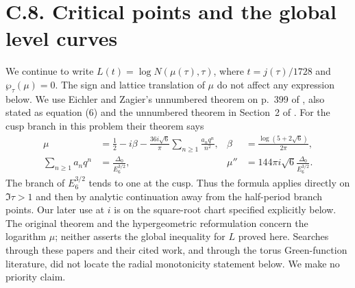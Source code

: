 \section{C.8. Critical points and the global level curves}

We continue to write $L(t)=\log N(\mu(\tau),\tau)$, where
$t=j(\tau)/1728$ and $\wp_\tau(\mu)=0$. The sign and lattice
translation of $\mu$ do not affect any expression below. We use
Eichler and Zagier's unnumbered theorem on p.~399 of
\cite{EichlerZagier1982}, also stated as equation (6) and the
unnumbered theorem in Section~2 of \cite{DukeImamoglu2008}.
For the cusp branch in this problem their theorem says
\begin{equation}\label{eq:cc-EZ}
 \begin{aligned}
 \mu&=\frac12-i\beta-
       \frac{36i\sqrt6}{\pi}\sum_{n\ge1}\frac{a_nq^n}{n^2},
 &\beta&=\frac{\log(5+2\sqrt6)}{2\pi},\\
 \sum_{n\ge1}a_nq^n&=\frac{\Delta_0}{E_6^{3/2}},
 &\mu''&=144\pi i\sqrt6\frac{\Delta_0}{E_6^{3/2}}.
 \end{aligned}
\end{equation}
The branch of $E_6^{3/2}$ tends to one at the cusp. Thus the
formula applies directly on $\Im\tau>1$ and then by analytic
continuation away from the half-period branch points. Our later
use at $i$ is on the square-root chart specified explicitly below.
The original theorem and the hypergeometric reformulation concern
the logarithm $\mu$; neither asserts the global inequality for
$L$ proved here. Searches through these papers and their cited
work, and through the torus Green-function literature, did not
locate the radial monotonicity statement below. We make no
priority claim.

